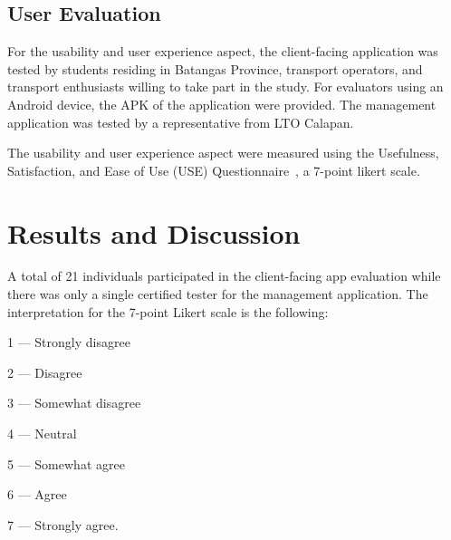 \documentclass[journal]{./IEEE/IEEEtran}
\begin{document}
\subsection{User Evaluation}
For the usability and user experience aspect, the client-facing application was tested by students residing in Batangas Province, transport operators, and transport enthusiasts willing to take part in the study. For evaluators using an Android device, the APK of the application were provided.
The management application was tested by a representative from LTO Calapan.

The usability and user experience aspect were measured using the Usefulness, Satisfaction, and Ease of Use (USE) Questionnaire~\cite{Lund01}, a 7-point likert scale. 



\section{Results and Discussion}
A total of 21 individuals participated in the client-facing app evaluation while there was only a single certified tester for the management application. The interpretation for the 7-point Likert scale is the following:

\begin{description}
    \item 1 --- Strongly disagree
    \item 2 --- Disagree
    \item 3 --- Somewhat disagree
    \item 4 --- Neutral
    \item 5 --- Somewhat agree
    \item 6 --- Agree
    \item 7 --- Strongly agree.
\end{description}
\end{document}
